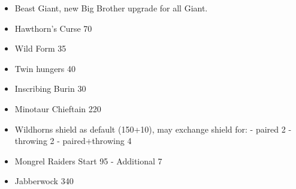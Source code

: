 %
%

%

%

%

%

%

%

\subtitle{Terrors of the Wild}

\begin{itemize}
\item Beast Giant, new Big Brother upgrade for all Giant.
\end{itemize}

\subtitle{Points}
\begin{itemize}
\item Hawthorn's Curse 70
\item Wild Form 35
\item Twin hungers 40
\item Inscribing Burin 30
\item Minotaur Chieftain 220
\item Wildhorns shield as default (150+10), may exchange shield for:
- paired 2
- throwing 2
- paired+throwing 4
\item Mongrel Raiders Start 95
- Additional 7
\item Jabberwock 340
\end{itemize}


